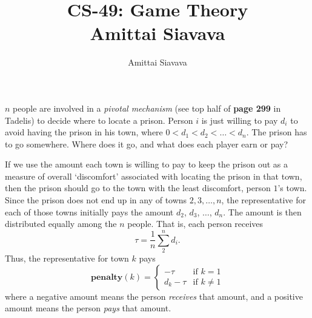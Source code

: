 \documentclass[11pt, reqno]{amsart}
\begin{document}

\title{CS-49: Game Theory\\ Amittai Siavava \\ }
\author{Amittai Siavava}


\setlength{\headheight}{13.0pt}
\setlength{\footskip}{15.0pt}

\maketitle

\bigskip

\def \cram { \textsc{cram} }
\def \dom { \textsc{domineering} }
\def \sub { \textsc{subtraction} }
\def \weighted { \textsc{weighted odds and evens}}
\def \nim { \textsc{nim} }
\def \P { \mathbf{P}}
\def \N { \mathbf{N}}
\def \cc { \mathbf{cc} }
\def \hackenbush { \textsc{LR hackenbush} }
\def \clobber { \textsc{clobber} }

  \begin{problem}[25]
    $n$ people are involved in a \emph{pivotal mechanism} (see top half of \textbf{page 299} in Tadelis)
    to decide where to locate a prison. Person $i$ is just willing to pay $d_i$ to avoid having the prison in his town,
    where $0 < d_1 < d_2 < \ldots < d_n$.
    The prison has to go somewhere.
    Where does it go, and what does each player earn or pay?

    \step
    If we use the amount each town is willing to pay to keep the prison out as a measure of overall `discomfort'
    associated with locating the prison in that town, then the prison should go to the town with the least discomfort,
    person $1$'s town.
    Since the prison does not end up in any of towns $2, 3, \ldots, n$, the representative for each of those towns
    initially pays the amount $d_2$, $d_3$, $\ldots$, $d_n$. The amount is then distributed equally among the $n$ people.
    That is, each person receives \[ \tau = \frac{1}{n} \sum_{2}^{n} d_i. \]
    Thus, the representative for town $k$ pays
    \[
      \mathbf{penalty}(k) = \begin{cases}
        - \tau & \text{if $k = 1$} \\
        d_k - \tau & \text{if $k \neq 1$}
      \end{cases}
    \]
    where a negative amount means the person \emph{receives} that amount, and a positive amount means 
    the person \emph{pays} that amount.
  \end{problem}
\end{document}
